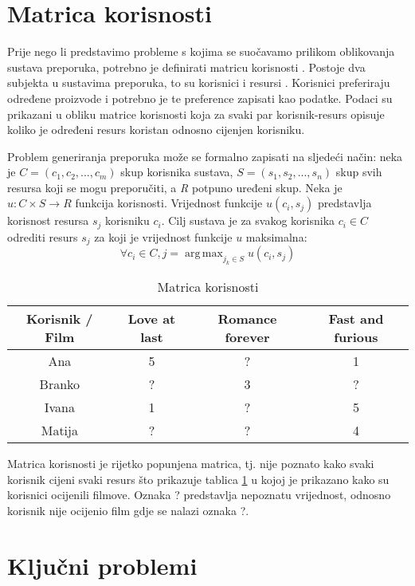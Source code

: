\documentclass[times, utf8, seminar]{fer}
\DeclareMathOperator*{\argmax}{arg\,max}
\begin{document}
\section{Matrica korisnosti}

Prije nego li predstavimo probleme s kojima se suočavamo prilikom oblikovanja sustava preporuka, potrebno je definirati matricu korisnosti . Postoje dva subjekta u sustavima preporuka, to su korisnici  i resursi .  Korisnici preferiraju određene proizvode i potrebno je te preference zapisati kao podatke. Podaci su prikazani u obliku matrice korisnosti koja za svaki par korisnik-resurs opisuje koliko je određeni resurs koristan odnosno cijenjen korisniku.

Problem generiranja preporuka može se formalno zapisati na sljedeći način: neka je $C=(c_1, c_2, ..., c_m)$ skup korisnika sustava, $S=(s_1, s_2, ..., s_n)$ skup svih resursa koji se mogu preporučiti, a \textit{R} potpuno uređeni skup. Neka je $u: C \times S \rightarrow{R}$ funkcija korisnosti. Vrijednost funkcije $u(c_i, s_j)$ predstavlja korisnost resursa $s_j$ korisniku $c_i$. Cilj sustava je za svakog korisnika $c_i \in C$ odrediti resurs $s_j$ za koji je vrijednost funkcije $u$ maksimalna:
	\begin{equation}
		\forall c_i \in C, j = \argmax_{j_k \in S} u(c_i, s_j)
	\end{equation}
	
\begin{table}[htb]
	\caption{Matrica korisnosti}
	\label{tbl:utility_matrix}
	\centering
		\begin{tabular}{|c|c|c|c|} 
		\hline
		 Korisnik / Film & Love at last & Romance forever & Fast and furious \\ 
		\hline
		Ana & 5 & ? & 1 \\
		Branko & ? & 3 & ? \\
		Ivana & 1 & ? & 5 \\
		Matija & ? & ? & 4 \\ 
		\hline
		\end{tabular}
\end{table}

Matrica korisnosti je rijetko popunjena matrica, tj. nije poznato kako svaki korisnik cijeni svaki resurs što prikazuje tablica \ref{tbl:utility_matrix} u kojoj je prikazano kako su korisnici ocijenili filmove. Oznaka ? predstavlja nepoznatu vrijednost, odnosno korisnik nije ocijenio film gdje se nalazi oznaka ?. 

\section{Ključni problemi}
\end{document}
